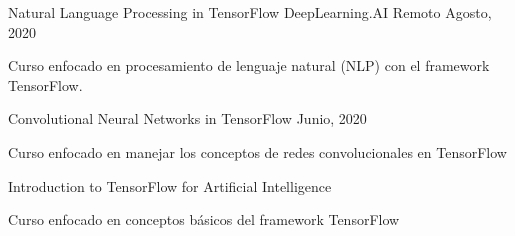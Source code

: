 

\begin{cventries}

  \cventry
    {Natural Language Processing in TensorFlow} %
    {DeepLearning.AI} %
    {Remoto} %
    {Agosto, 2020} %
    {
      \begin{cvitems} %
        \item {Curso enfocado en procesamiento de lenguaje natural (NLP) con el framework TensorFlow.}
      \end{cvitems}
    }

\cventry
{Convolutional Neural Networks in TensorFlow} %
{} %
{} %
{Junio, 2020} %
{
  \begin{cvitems} %
    \item {Curso enfocado en manejar los conceptos de redes convolucionales en TensorFlow}
  \end{cvitems}
}

\cventry
{Introduction to TensorFlow for Artificial Intelligence} %
{} %
{} %
{} %
{
  \begin{cvitems} %
    \item {Curso enfocado en conceptos básicos del framework TensorFlow}
  \end{cvitems}
}

\end{cventries}
